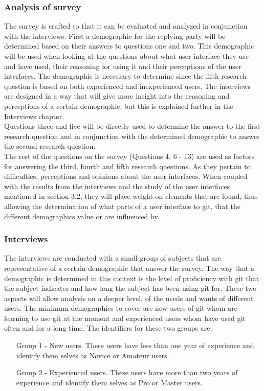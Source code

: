 \documentclass[12pt,a4paper,article,compsoc]{IEEEtran}
\begin{document}
				\subsubsection*{Analysis of survey}
				The survey is crafted so that it can be evaluated and analyzed in conjunction with the interviews. 
				First a demographic for the replying party will be determined based on their answers to questions one and two. This demographic will be used when looking at the questions about what user interface they use and have used, their reasoning for using it and their perceptions of the user interfaces. The demographic is necessary to determine since the fifth research question is based on both experienced and inexperienced users. The interviews are designed in a way that will give more insight into the reasoning and perceptions of a certain demographic, but this is explained further in the Interviews chapter.
				\\
				Questions three and five will be directly used to determine the answer to the first research question and in conjunction with the determined demographic to answer the second research question.
				\\
				The rest of the questions on the survey (Questions 4, 6 - 13) are used as factors for answering the third, fourth and fifth research questions. As they pertain to difficulties, perceptions and opinions about the user interfaces. When coupled with the results from the interviews and the study of the user interfaces mentioned in section 3.2, they will place weight on elements that are found, thus allowing the determination of what parts of a user interface to git, that the different demographics value or are influenced by.
				
				\subsubsection{Interviews}
				The interviews are conducted with a small group of subjects that are representative of a certain demographic that answer the survey. The way that a demographic is determined in this context is the level of proficiency with git that the subject indicates and how long the subject has been using git for. 
				These two aspects will allow analysis on a deeper level, of the needs and wants of different users. The minimum demographics to cover are new users of git whom are learning to use git at the moment and experienced users whom have used git often and for a long time. The identifiers for these two groups are;
				\begin{itemize}
					\item[Group 1 - New users.]
					These users have less than one year of experience and identify them selves as Novice or Amateur users.
					\item[Group 2 - Experienced users.]
					These users have more than two years of experience and identify them selves as Pro or Master users.
				\end{itemize}
\end{document}
